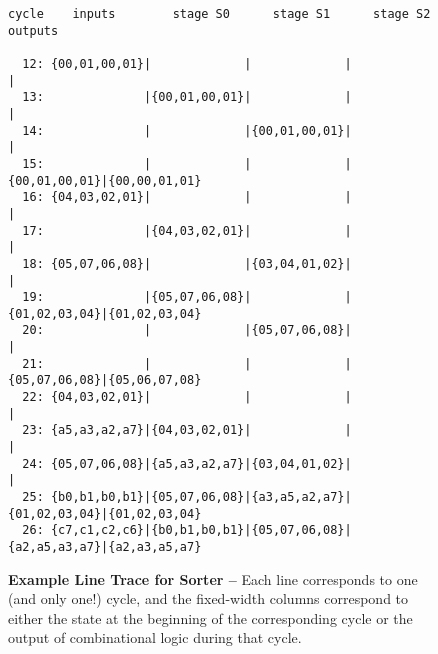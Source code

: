 
\begin{figure}

  \footnotesize
  \begin{Verbatim}[xleftmargin=0.65in]
cycle    inputs        stage S0      stage S1      stage S2      outputs

  12: {00,01,00,01}|             |             |             |
  13:              |{00,01,00,01}|             |             |
  14:              |             |{00,01,00,01}|             |
  15:              |             |             |{00,01,00,01}|{00,00,01,01}
  16: {04,03,02,01}|             |             |             |
  17:              |{04,03,02,01}|             |             |
  18: {05,07,06,08}|             |{03,04,01,02}|             |
  19:              |{05,07,06,08}|             |{01,02,03,04}|{01,02,03,04}
  20:              |             |{05,07,06,08}|             |
  21:              |             |             |{05,07,06,08}|{05,06,07,08}
  22: {04,03,02,01}|             |             |             |
  23: {a5,a3,a2,a7}|{04,03,02,01}|             |             |
  24: {05,07,06,08}|{a5,a3,a2,a7}|{03,04,01,02}|             |
  25: {b0,b1,b0,b1}|{05,07,06,08}|{a3,a5,a2,a7}|{01,02,03,04}|{01,02,03,04}
  26: {c7,c1,c2,c6}|{b0,b1,b0,b1}|{05,07,06,08}|{a2,a5,a3,a7}|{a2,a3,a5,a7}
  \end{Verbatim}

  \caption{\textbf{Example Line Trace for Sorter --} Each line
    corresponds to one (and only one!) cycle, and the fixed-width columns
    correspond to either the state at the beginning of the corresponding
    cycle or the output of combinational logic during that cycle.}
  \label{fig-tut3-linetrace}

\end{figure}

